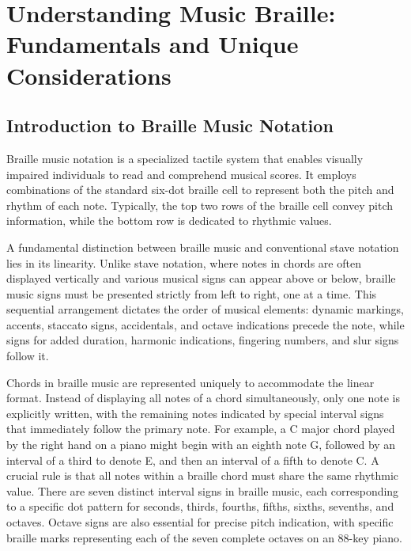 \section{Understanding Music Braille: Fundamentals and Unique Considerations}\label{sec:music-braille-fundamentals}

\subsection{Introduction to Braille Music Notation}\label{subsec:intro-braille-music}
Braille music notation is a specialized tactile system that enables visually impaired individuals to read and comprehend musical scores. It employs combinations of the standard six-dot braille cell to represent both the pitch and rhythm of each note. Typically, the top two rows of the braille cell convey pitch information, while the bottom row is dedicated to rhythmic values. \cite{RNIBBrailleMusic}

A fundamental distinction between braille music and conventional stave notation lies in its linearity. Unlike stave notation, where notes in chords are often displayed vertically and various musical signs can appear above or below, braille music signs must be presented strictly from left to right, one at a time. \cite{rnib-braille-music} This sequential arrangement dictates the order of musical elements: dynamic markings, accents, staccato signs, accidentals, and octave indications precede the note, while signs for added duration, harmonic indications, fingering numbers, and slur signs follow it. \cite{rnib-braille-music}

Chords in braille music are represented uniquely to accommodate the linear format. Instead of displaying all notes of a chord simultaneously, only one note is explicitly written, with the remaining notes indicated by special interval signs that immediately follow the primary note. \cite{loc-braille-intervals} For example, a C major chord played by the right hand on a piano might begin with an eighth note G, followed by an interval of a third to denote E, and then an interval of a fifth to denote C. A crucial rule is that all notes within a braille chord must share the same rhythmic value. \cite{loc-braille-intervals} There are seven distinct interval signs in braille music, each corresponding to a specific dot pattern for seconds, thirds, fourths, fifths, sixths, sevenths, and octaves. \cite{loc-braille-intervals} Octave signs are also essential for precise pitch indication, with specific braille marks representing each of the seven complete octaves on an 88-key piano. \cite{musescore-braille}

